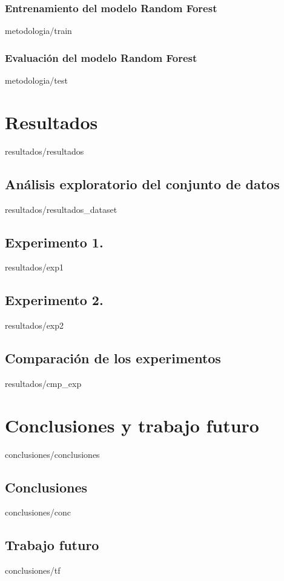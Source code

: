 \documentclass[epsbased,copyright,final,printable,covers,extendedindex,firstnumbered,tfg,gnuplot]{tfgtfmthesisuam}
\begin{document}
    \subsection{Entrenamiento del modelo Random Forest\label{SS:TRAIN}}{metodologia/train}
    \subsection{Evaluación del modelo Random Forest\label{SS:TEST}}{metodologia/test}
\chapter{Resultados\label{CAP:RESULTADOS}}{resultados/resultados}
  \section{Análisis exploratorio del conjunto de datos\label{SEC:RES_DATASET}}{resultados/resultados_dataset}
  \section{Experimento 1.\label{SEC:EXP1}}{resultados/exp1}
  \section{Experimento 2.\label{SEC:EXP2}}{resultados/exp2}
  \section{Comparación de los experimentos\label{SEC:CMP_EXP}}{resultados/cmp_exp}
\chapter{Conclusiones y trabajo futuro\label{CAP:CONCLUSIONES}}{conclusiones/conclusiones}
  \section{Conclusiones\label{SEC:CONC}}{conclusiones/conc}
  \section{Trabajo futuro\label{SEC:TF}}{conclusiones/tf}
\end{document}
